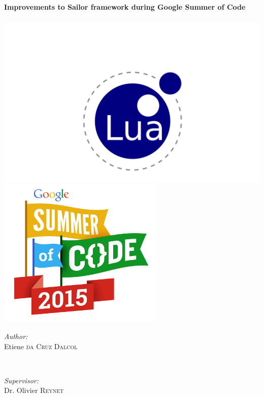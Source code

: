 \documentclass{article}
\begin{document}
\begin{titlepage}
\HRule \\[0.4cm]
{ \huge \bfseries Improvements to Sailor framework during Google Summer of Code}\\[0.4cm] %
\HRule \\[0.5cm]


\includegraphics[scale=0.15]{logo-lua.png}
\includegraphics[scale=0.3]{gsoclogo.jpg}\\[1.5cm]
 

\begin{minipage}{0.4\textwidth}
\begin{flushleft} \large
\emph{Author:}\\
Etiene \textsc{da Cruz Dalcol} %
\end{flushleft}
\end{minipage}
~
\begin{minipage}{0.4\textwidth}
\begin{flushright} \large
\emph{Supervisor:} \\
Dr. Olivier \textsc{Reynet} %
\end{flushright}
\end{minipage}\\[1.1cm]


\end{titlepage}
\end{document}
